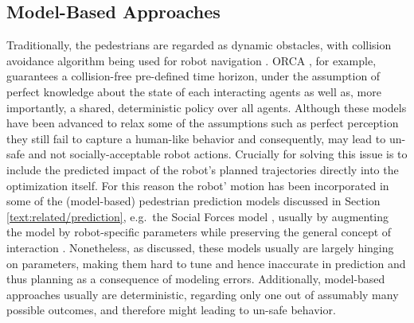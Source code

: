 \subsection{Model-Based Approaches}
Traditionally, the pedestrians are regarded as dynamic obstacles, with collision avoidance algorithm being used for robot navigation \cite{vandenBerg2011}\cite{Fox1997}\cite{Luo2018a}\cite{Phillips2011}. \ac{ORCA} \cite{vandenBerg2011}, for example, guarantees a collision-free pre-defined time horizon, under the assumption of perfect knowledge about the state of each interacting agents as well as, more importantly, a shared, deterministic policy over all agents. Although these models have been advanced to relax some of the assumptions such as perfect perception \cite{Hennes2012} they still fail to capture a human-like behavior and consequently, may lead to un-safe and not socially-acceptable robot actions. Crucially for solving this issue is to include the predicted impact of the robot's planned trajectories directly into the optimization itself. For this reason the robot' motion has been incorporated in some of the (model-based) pedestrian prediction models discussed in Section \ref{text:related/prediction}, e.g.\ the Social Forces model \cite{Helbing1995}, usually by augmenting the model by robot-specific parameters while preserving the general concept of interaction \cite{Ferrer2013}\cite{Luo2018a}. Nonetheless, as discussed, these models usually are largely hinging on parameters, making them hard to tune and hence inaccurate in prediction and thus planning as a consequence of modeling errors. Additionally, model-based approaches usually are deterministic, regarding only one out of assumably many possible outcomes, and therefore might leading to un-safe behavior.

